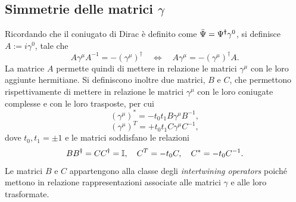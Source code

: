 
\subsection{Simmetrie delle matrici \texorpdfstring{$\gamma$}{gamma}}
Ricordando che il coniugato di Dirac è definito come $\bar{\Psi} = \Psi^\dag\gamma^0$, si definisce $A := i\gamma^0$, tale che
\begin{equation}
    A\gamma^\mu A^{-1} = -(\gamma^\mu)^\dag
    \quad\Longleftrightarrow\quad
    A\gamma^\mu=-(\gamma^\mu)^\dag A.
\end{equation}
La matrice $A$ permette quindi di mettere in relazione le matrici $\gamma^\mu$ con le loro aggiunte hermitiane. Si definiscono inoltre due matrici, $B$ e $C$, che permettono rispettivamente di mettere in relazione le matrici $\gamma^\mu$ con le loro coniugate complesse e con le loro trasposte, per cui
\begin{equation}
    (\gamma^\mu)^* = -t_0t_1B\gamma^\mu B^{-1},
\end{equation}
\begin{equation}
    (\gamma^\mu)^T = +t_0t_1C\gamma^\mu C^{-1},
\end{equation}
dove $t_0,t_1 = \pm 1$ e le matrici soddisfano le relazioni
\begin{equation}
    BB^\dag = CC^\dag = \mathbb{I},\quad C^T = -t_0C,\quad C^* = -t_0C^{-1}.
\end{equation}
Le matrici $B$ e $C$ appartengono alla classe degli \emph{intertwining operators} poiché mettono in relazione rappresentazioni associate alle matrici $\gamma$ e alle loro trasformate.

